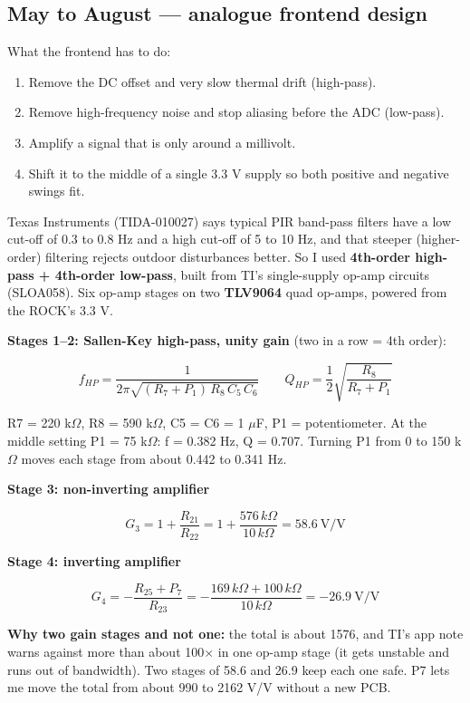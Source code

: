 \documentclass[11pt,a4paper]{article}
\providecommand{\tightlist}{\setlength{\itemsep}{0pt}\setlength{\parskip}{0pt}}
\begin{document}
\hypertarget{may-to-august-analogue-frontend-design}{%
\subsection{May to August ---
analogue frontend
design}\label{may-to-august-analogue-frontend-design}}

What the frontend has to do:

\begin{enumerate}
\def\labelenumi{\arabic{enumi}.}
\tightlist
\item
  Remove the DC offset and
  very slow thermal drift
  (high-pass).
\item
  Remove high-frequency noise
  and stop aliasing before the
  ADC (low-pass).
\item
  Amplify a signal that is
  only around a millivolt.
\item
  Shift it to the middle of a
  single 3.3 V supply so both
  positive and negative swings
  fit.
\end{enumerate}

Texas Instruments
(TIDA-010027) says typical PIR
band-pass filters have a low
cut-off of 0.3 to 0.8 Hz and a
high cut-off of 5 to 10 Hz,
and that steeper
(higher-order) filtering
rejects outdoor disturbances
better. So I used
\textbf{4th-order high-pass +
4th-order low-pass}, built
from TI's single-supply op-amp
circuits (SLOA058). Six op-amp
stages on two \textbf{TLV9064}
quad op-amps, powered from the
ROCK's 3.3 V.

\textbf{Stages 1--2:
Sallen-Key high-pass, unity
gain} (two in a row = 4th
order):

\[
f_{HP} = \frac{1}{2\pi\sqrt{(R_7+P_1)\,R_8\,C_5\,C_6}} \qquad Q_{HP} = \frac{1}{2}\sqrt{\frac{R_8}{R_7+P_1}}
\]

R7 = 220 k$\Omega$, R8 = 590 k$\Omega$, C5 =
C6 = 1 $\mu$F, P1 = potentiometer.
At the middle setting P1 = 75
k$\Omega$: f = 0.382 Hz, Q = 0.707.
Turning P1 from 0 to 150 k$\Omega$
moves each stage from about
0.442 to 0.341 Hz.

\textbf{Stage 3: non-inverting
amplifier}

\[
G_3 = 1 + \frac{R_{21}}{R_{22}} = 1 + \frac{576\,k\Omega}{10\,k\Omega} = 58.6\ \text{V/V}
\]

\textbf{Stage 4: inverting
amplifier}

\[
G_4 = -\frac{R_{25}+P_7}{R_{23}} = -\frac{169\,k\Omega + 100\,k\Omega}{10\,k\Omega} = -26.9\ \text{V/V}
\]

\textbf{Why two gain stages
and not one:} the total is
about 1576, and TI's app note
warns against more than about
100$\times$ in one op-amp stage (it
gets unstable and runs out of
bandwidth). Two stages of 58.6
and 26.9 keep each one safe.
P7 lets me move the total from
about 990 to 2162 V/V without
a new PCB.
\end{document}
